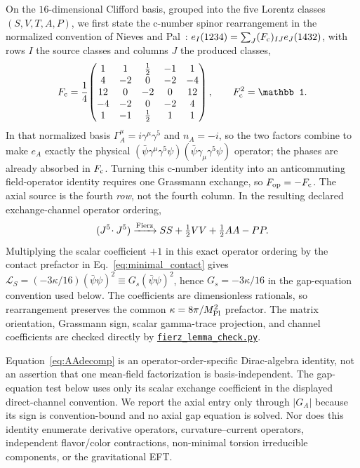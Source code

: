 \documentclass[aps,prd,twocolumn,superscriptaddress,showpacs,preprintnumbers,nofootinbib,longbibliography,floatfix]{revtex4-2}
\newcommand{\artifactnamed}[2]{\href{https://github.com/Hubify-Projects/bigbounce/blob/main/#1}{\nolinkurl{#2}}}
\begin{document}
On the $16$-dimensional Clifford basis, grouped into the five Lorentz classes
$(S,V,T,A,P)$, we first state the c-number spinor rearrangement in the
normalized convention of Nieves and Pal~\cite{ItzyksonZuber,NievesPal2004}:
$e_I(1234)=\sum_J(F_{\rm c})_{IJ}e_J(1432)$, with rows $I$ the source classes
and columns $J$ the produced classes,
\begin{equation}\label{eq:fierzmatrix}
F_{\rm c}=\frac14\!\begin{pmatrix}
1&1&\tfrac12&-1&1\\
4&-2&0&-2&-4\\
12&0&-2&0&12\\
-4&-2&0&-2&4\\
1&-1&\tfrac12&1&1
\end{pmatrix},\qquad F_{\rm c}^{2}=\mathbb 1.
\end{equation}
In that normalized basis $\Gamma_A^\mu=i\gamma^\mu\gamma^5$ and
$n_A=-i$, so the two factors combine to make $e_A$ exactly the physical
$(\bar\psi\gamma^\mu\gamma^5\psi)
(\bar\psi\gamma_\mu\gamma^5\psi)$ operator; the phases are already absorbed
in $F_{\rm c}$.  Turning this c-number identity into an anticommuting
field-operator identity requires one Grassmann exchange, so
$F_{\rm op}=-F_{\rm c}$.
The axial source is the fourth
\emph{row}, not the fourth column.  In the resulting declared exchange-channel
operator ordering,
\begin{equation}\label{eq:AAdecomp}
(J^5\!\cdot J^5)\xrightarrow{\rm Fierz}
SS+\tfrac12 VV+\tfrac12 AA-PP.
\end{equation}
Multiplying the scalar coefficient $+1$ in this exact operator ordering by
the contact prefactor in Eq.~\eqref{eq:minimal_contact} gives
$\mathcal L_{S}=(-3\kappa/16)(\bar\psi\psi)^2
\equiv G_s(\bar\psi\psi)^2$, hence $G_s=-3\kappa/16$ in the gap-equation
convention used below.
The coefficients are dimensionless rationals, so rearrangement preserves the
common $\kappa=8\pi/M_{\rm Pl}^{2}$ prefactor.  The matrix orientation,
Grassmann sign, scalar gamma-trace projection, and channel coefficients are
checked directly by
\artifactnamed{arxiv/scripts/fierz_lemma_check.py}{fierz_lemma_check.py}.

Equation~\eqref{eq:AAdecomp} is an operator-order-specific Dirac-algebra
identity, not an assertion that one mean-field factorization is
basis-independent.  The gap-equation test below uses only its scalar exchange
coefficient in the displayed direct-channel convention.  We report the axial
entry only through $|G_A|$ because its sign is convention-bound and no axial
gap equation is solved.  Nor does this identity enumerate derivative
operators, curvature--current operators, independent flavor/color
contractions, non-minimal torsion irreducible components, or the gravitational
EFT.
\end{document}
